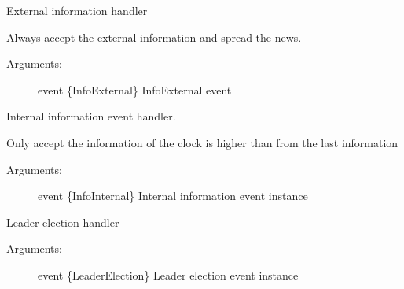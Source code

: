 \documentclass[letterpaper,10pt,english]{sphinxmanual}
\begin{document}
\begin{fulllineitems}
\begin{fulllineitems}
\begin{description}
\end{description}

\end{fulllineitems}


\begin{fulllineitems}
\label{\detokenize{index:fish.Fish.info_ext_handler}}
External information handler

Always accept the external information and spread the news.
\begin{description}
\item[{Arguments:}] \leavevmode
event \{InfoExternal\} \textendash{} InfoExternal event

\end{description}

\end{fulllineitems}


\begin{fulllineitems}
\label{\detokenize{index:fish.Fish.info_int_handler}}
Internal information event handler.

Only accept the information of the clock is higher than from the last
information
\begin{description}
\item[{Arguments:}] \leavevmode
event \{InfoInternal\} \textendash{} Internal information event instance

\end{description}

\end{fulllineitems}


\begin{fulllineitems}
\label{\detokenize{index:fish.Fish.leader_election_handler}}
Leader election handler
\begin{description}
\item[{Arguments:}] \leavevmode
event \{LeaderElection\} \textendash{} Leader election event instance


\end{description}
\end{fulllineitems}
\end{fulllineitems}
\end{document}

